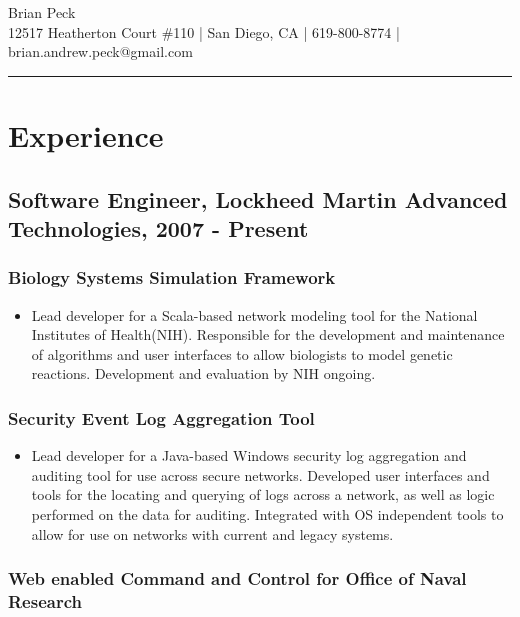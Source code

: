 \documentclass[11pt]{article}
\title{}
\date{}
\begin{document}
\begin{center}
{\huge Brian Peck} \\
12517 Heatherton Court \#110 | San Diego, CA | 619-800-8774 | brian.andrew.peck@gmail.com
\hrule
\end{center}

\section*{Experience}
\label{sec-1}

\subsection*{Software Engineer, Lockheed Martin Advanced Technologies, 2007 - Present}
\label{sec-1.1}

\subsubsection*{Biology Systems Simulation Framework}
\label{sec-1.1.1}

\begin{itemize}
\item Lead developer for a Scala-based network modeling tool for the National Institutes of Health(NIH). Responsible for the development and maintenance of algorithms and user interfaces to allow biologists to model genetic reactions. Development and evaluation by NIH ongoing.
\end{itemize}
\subsubsection*{Security Event Log Aggregation Tool}
\label{sec-1.1.2}

\begin{itemize}
\item Lead developer for a Java-based Windows security log aggregation and auditing tool for use across secure networks. Developed user interfaces and tools for the locating and querying of logs across a network, as well as logic performed on the data for auditing. Integrated with OS independent tools to allow for use on networks with current and legacy systems.
\end{itemize}
\subsubsection*{Web enabled Command and Control for Office of Naval Research}
\label{sec-1.1.3}
\end{document}
